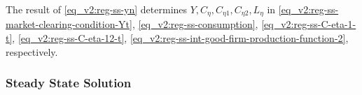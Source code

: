 \documentclass[../thesis.tex]{subfiles}
\begin{document}
\begin{comment}
Substitute \ref{eq_v2:reg-ss-C21} in \ref{eq_v2:reg-ss-C22}:
\begin{align}
	C_{22} &= C_{21} \left( \frac{1 - \omega_{21}}{\omega_{21} \theta_{P}} \right) = C_{2} \left( \frac{\omega_{21} \theta_{P}}{1 - \omega_{21}} \right)^{1 - \omega_{21}} \left( \frac{1 - \omega_{21}}{\omega_{21} \theta_{P}} \right) \tag{\ref{eq_v2:reg-ss-C22}} \implies \\
	C_{22} &= C_{2} b_{2}^{\omega_{21}} \label{eq_v2:reg-ss-C22-b}
\end{align}
	
\end{comment}








	The result of \ref{eq_v2:reg-ss-yn} determines $Y, C_{\eta}, C_{\eta 1}, C_{\eta 2}, L_{\eta}$ in 
	\ref{eq_v2:reg-ss-market-clearing-condition-Yt}, 
	\ref{eq_v2:reg-ss-consumption}, 
	\ref{eq_v2:reg-ss-C-eta-1-t}, 
	\ref{eq_v2:reg-ss-C-eta-12-t}, 
	\ref{eq_v2:reg-ss-int-good-firm-production-function-2}, respectively.
	


	
	
	\subsubsection{Steady State Solution}
	
	\vspace*{-1cm}
\end{document}
